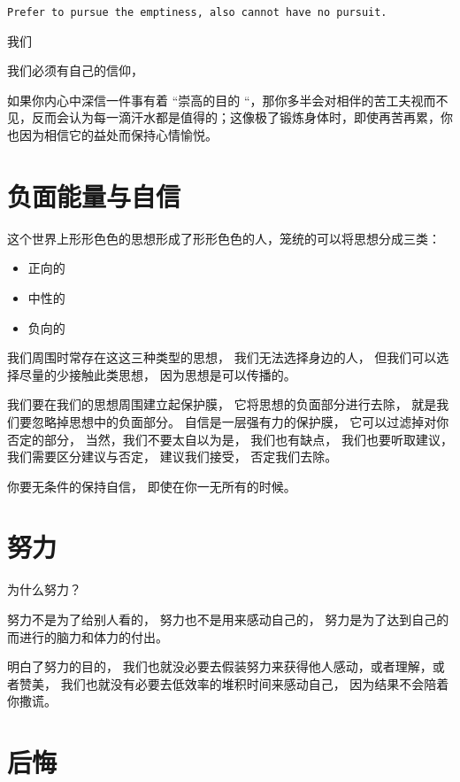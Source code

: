 \begin{center}
\begin{verbatim}
Prefer to pursue the emptiness, also cannot have no pursuit.
\end{verbatim}
\end{center}

我们

我们必须有自己的信仰，

如果你内心中深信一件事有着 “崇高的目的 “，那你多半会对相伴的苦工夫视而不见，反而会认为每一滴汗水都是值得的；这像极了锻炼身体时，即使再苦再累，你也因为相信它的益处而保持心情愉悦。



\section{负面能量与自信}

这个世界上形形色色的思想形成了形形色色的人，笼统的可以将思想分成三类：
\begin{itemize}
\item 正向的
\item 中性的
\item 负向的
\end{itemize}


我们周围时常存在这这三种类型的思想，
我们无法选择身边的人，
但我们可以选择尽量的少接触此类思想，
因为思想是可以传播的。


我们要在我们的思想周围建立起保护膜，
它将思想的负面部分进行去除，
就是我们要忽略掉思想中的负面部分。
自信是一层强有力的保护膜，
它可以过滤掉对你否定的部分，
当然，我们不要太自以为是，
我们也有缺点，
我们也要听取建议，
我们需要区分建议与否定，
建议我们接受，
否定我们去除。


你要无条件的保持自信，
即使在你一无所有的时候。




\section{努力}

为什么努力？

努力不是为了给别人看的，
努力也不是用来感动自己的，
努力是为了达到自己的而进行的脑力和体力的付出。

明白了努力的目的，
我们也就没必要去假装努力来获得他人感动，或者理解，或者赞美，
我们也就没有必要去低效率的堆积时间来感动自己，
因为结果不会陪着你撒谎。




\section{后悔}

